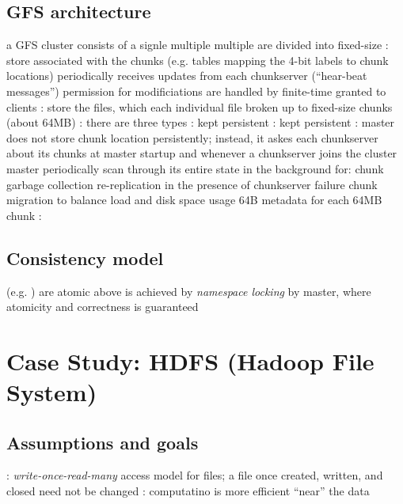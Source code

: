 \documentclass{note}
\begin{document}
\subsection{GFS architecture}
\bit
\w a GFS cluster consists of 
   \bit
   \w a signle 
   \w multiple 
   \w multiple 
   \eit
\w {} are divided into fixed-size 
\w {}: 
   \bit
   \w store  associated with the chunks (e.g. tables mapping the 4-bit
   labels to chunk locations)
   \w periodically receives updates from each chunkserver (``hear-beat
   messages'') 
   \w permission for modificiations are handled by finite-time 
   granted to clients
   \eit
\w {}: 
    \bit
    \w store the files, which each individual file broken up to fixed-size
    chunks (about 64MB)
    \eit
\w {}: there are three types
   \bit
   \w {}: kept persistent
   \w {}: kept persistent
   \w {}: master does not store chunk
   location persistently; instead, it askes each chunkserver about its chunks
   at master startup and whenever a chunkserver joins the cluster
   \eit
\w {}
   \bit
   \w master periodically scan through its entire state in the background for:
      \bit
      \w  chunk garbage collection
      \w re-replication in the presence of chunkserver failure
      \w chunk migration to balance load and disk space usage
      \eit
   \w 64B metadata for each 64MB chunk
   \eit
\w {}:
\eit

\subsection{Consistency model}
\bit
\w {} (e.g. ) are atomic
\w above is achieved by {\em namespace locking\/} by master, where atomicity
  and correctness is guaranteed 
\eit

%
%
%
\section{Case Study: HDFS (Hadoop File System)}
\subsection{Assumptions and goals}
\bit
\w {}
\w {}
\w {}
\w {}: {\em write-once-read-many\/} access model for
files; a file once created, written, and closed need not be changed
\w {}: computatino is
more efficient ``near'' the data
\w {}
\eit
\end{document}
